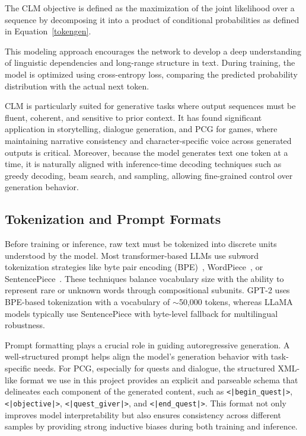 The CLM objective is defined as the maximization of the joint likelihood over a sequence
by decomposing it into a product of conditional probabilities as defined in Equation~\ref{tokengen}.

This modeling approach encourages the network to develop a deep understanding of
linguistic dependencies and long-range structure in text. During training, the model is
optimized using cross-entropy loss, comparing the predicted probability distribution with
the actual next token.

CLM is particularly suited for generative tasks where output sequences must be fluent,
coherent, and sensitive to prior context. It has found significant application in storytelling,
dialogue generation, and PCG for games, where maintaining narrative consistency and
character-specific voice across generated outputs is critical. Moreover, because the model
generates text one token at a time, it is naturally aligned with inference-time decoding
techniques such as greedy decoding, beam search, and sampling, allowing fine-grained
control over generation behavior.

\subsection{Tokenization and Prompt Formats}

Before training or inference, raw text must be tokenized into discrete units understood
by the model. Most transformer-based LLMs use subword tokenization strategies like
byte pair encoding (BPE)~\cite{shibata1999byte}, WordPiece~\cite{song2020fast}, or SentencePiece~\cite{kudo2018sentencepiece}. These techniques
balance vocabulary size with the ability to represent rare or unknown words through compositional
subunits. GPT-2 uses BPE-based tokenization with a vocabulary of $\sim$50,000
tokens, whereas LLaMA models typically use SentencePiece with byte-level fallback for
multilingual robustness.

Prompt formatting plays a crucial role in guiding autoregressive generation. A well-structured
prompt helps align the model's generation behavior with task-specific needs.
For PCG, especially for quests and dialogue, the structured XML-like format we use in
this project provides an explicit and parseable schema that delineates each component of
the generated content, such as \texttt{<|begin\_quest|>}, \texttt{<|objective|>}, \texttt{<|quest\_giver|>}, and
\texttt{<|end\_quest|>}. This format not only improves model interpretability but also ensures
consistency across different samples by providing strong inductive biases during both
training and inference.

